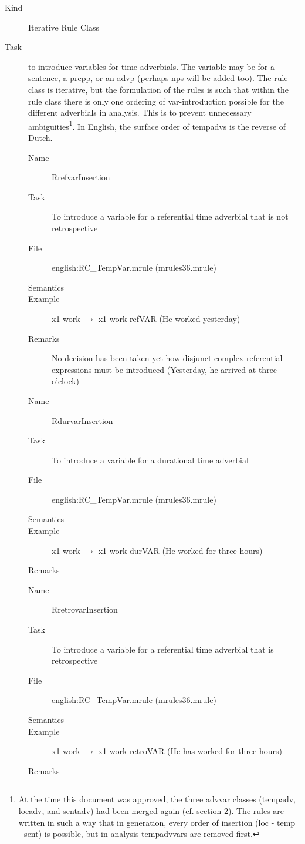 \begin{description}
\item[Kind] Iterative Rule Class
\item[Task] to introduce variables for time adverbials. The variable may be for 
a sentence, a prepp, or an advp (perhaps nps will be added too). The rule class is 
iterative, but the formulation of the rules is such that within the rule class 
there is only one 
ordering of var-introduction possible for the different adverbials in analysis.
 This is to 
prevent unnecessary ambiguities\footnote{At the time this document 
was approved, the three advvar classes (tempadv, locadv, and sentadv) had been 
merged again (cf. section 2). The rules are 
written in such a way that in generation, every order of insertion (loc - temp 
- sent) is possible, but in analysis tempadvvars are removed first.}. In 
English, the surface order of tempadvs is the reverse of Dutch.

\vspace{1 cm}
\begin{description}
\item[Name] RrefvarInsertion
\item[Task] To introduce a variable for a referential time adverbial that is 
not retrospective
\item[File] english:RC\_TempVar.mrule (mrules36.mrule)
\item[Semantics] 
\item[Example] x1 work $\rightarrow$ x1 work refVAR (He worked yesterday)
\item[Remarks] No decision has been taken yet how disjunct complex referential 
expressions must be introduced (Yesterday, he arrived at three o'clock)
\end{description}

\vspace{1 cm}
\begin{description}
\item[Name] RdurvarInsertion
\item[Task] To introduce a variable for a durational time adverbial 
\item[File] english:RC\_TempVar.mrule (mrules36.mrule)
\item[Semantics] 
\item[Example] x1 work $\rightarrow$ x1 work durVAR (He worked for three hours)
\item[Remarks]
\end{description}

\vspace{1 cm}
\begin{description}
\item[Name] RretrovarInsertion
\item[Task] To introduce a variable for a referential time adverbial that is 
retrospective
\item[File] english:RC\_TempVar.mrule (mrules36.mrule)
\item[Semantics] 
\item[Example] x1 work $\rightarrow$ x1 work retroVAR (He has worked for three 
hours)
\item[Remarks]
\end{description}


\end{description}
